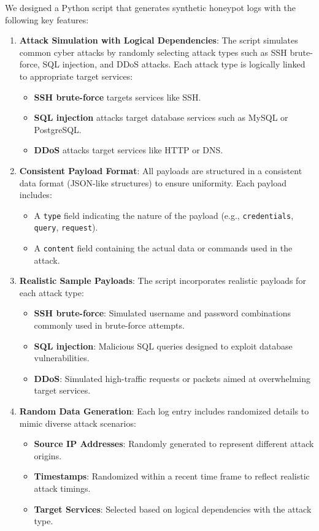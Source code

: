 \documentclass[conference]{IEEEtran}
\begin{document}
We designed a Python script that generates synthetic honeypot logs with the following key features:

\begin{enumerate}
    \item \textbf{Attack Simulation with Logical Dependencies}: The script simulates common cyber attacks by randomly selecting attack types such as SSH brute-force, SQL injection, and DDoS attacks. Each attack type is logically linked to appropriate target services:
    \begin{itemize}
        \item \textbf{SSH brute-force} targets services like SSH.
        \item \textbf{SQL injection} attacks target database services such as MySQL or PostgreSQL.
        \item \textbf{DDoS} attacks target services like HTTP or DNS.
    \end{itemize}
    
    \item \textbf{Consistent Payload Format}: All payloads are structured in a consistent data format (JSON-like structures) to ensure uniformity. Each payload includes:
    \begin{itemize}
        \item A \texttt{type} field indicating the nature of the payload (e.g., \texttt{credentials}, \texttt{query}, \texttt{request}).
        \item A \texttt{content} field containing the actual data or commands used in the attack.
    \end{itemize}
    
    \item \textbf{Realistic Sample Payloads}: The script incorporates realistic payloads for each attack type:
    \begin{itemize}
        \item \textbf{SSH brute-force}: Simulated username and password combinations commonly used in brute-force attempts.
        \item \textbf{SQL injection}: Malicious SQL queries designed to exploit database vulnerabilities.
        \item \textbf{DDoS}: Simulated high-traffic requests or packets aimed at overwhelming target services.
    \end{itemize}
    
    \item \textbf{Random Data Generation}: Each log entry includes randomized details to mimic diverse attack scenarios:
    \begin{itemize}
        \item \textbf{Source IP Addresses}: Randomly generated to represent different attack origins.
        \item \textbf{Timestamps}: Randomized within a recent time frame to reflect realistic attack timings.
        \item \textbf{Target Services}: Selected based on logical dependencies with the attack type.
    \end{itemize}
    

\end{enumerate}
\end{document}
